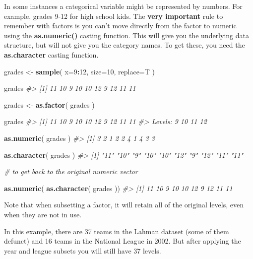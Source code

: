 \documentclass[]{book}
\newenvironment{Shaded}{\begin{snugshade}}{\end{snugshade}}
\newcommand{\CommentTok}[1]{\textcolor[rgb]{0.56,0.35,0.01}{\textit{#1}}}
\newcommand{\DataTypeTok}[1]{\textcolor[rgb]{0.13,0.29,0.53}{#1}}
\newcommand{\DecValTok}[1]{\textcolor[rgb]{0.00,0.00,0.81}{#1}}
\newcommand{\KeywordTok}[1]{\textcolor[rgb]{0.13,0.29,0.53}{\textbf{#1}}}
\newcommand{\NormalTok}[1]{#1}
\newcommand{\OperatorTok}[1]{\textcolor[rgb]{0.81,0.36,0.00}{\textbf{#1}}}
\newcommand{\StringTok}[1]{\textcolor[rgb]{0.31,0.60,0.02}{#1}}
\theoremstyle{definition}
\theoremstyle{definition}
\theoremstyle{definition}
\theoremstyle{remark}
\begin{document}
In some instances a categorical variable might be represented by
numbers. For example, grades 9-12 for high school kids. The \textbf{very
important} rule to remember with factors is you can't move directly from
the factor to numeric using the \textbf{as.numeric()} casting function.
This will give you the underlying data structure, but will not give you
the category names. To get these, you need the \textbf{as.character}
casting function.

\begin{Shaded}
\begin{Highlighting}[]

\NormalTok{grades <-}\StringTok{ }\KeywordTok{sample}\NormalTok{( }\DataTypeTok{x=}\DecValTok{9}\OperatorTok{:}\DecValTok{12}\NormalTok{, }\DataTypeTok{size=}\DecValTok{10}\NormalTok{, }\DataTypeTok{replace=}\NormalTok{T )}

\NormalTok{grades}
\CommentTok{#>  [1] 11 10  9 10 10 12  9 12 11 11}

\NormalTok{grades <-}\StringTok{ }\KeywordTok{as.factor}\NormalTok{( grades )}

\NormalTok{grades}
\CommentTok{#>  [1] 11 10 9  10 10 12 9  12 11 11}
\CommentTok{#> Levels: 9 10 11 12}

\KeywordTok{as.numeric}\NormalTok{( grades )}
\CommentTok{#>  [1] 3 2 1 2 2 4 1 4 3 3}

\KeywordTok{as.character}\NormalTok{( grades )}
\CommentTok{#>  [1] "11" "10" "9"  "10" "10" "12" "9"  "12" "11" "11"}

\CommentTok{# to get back to the original numeric vector}

\KeywordTok{as.numeric}\NormalTok{( }\KeywordTok{as.character}\NormalTok{( grades ))}
\CommentTok{#>  [1] 11 10  9 10 10 12  9 12 11 11}
\end{Highlighting}
\end{Shaded}

Note that when subsetting a factor, it will retain all of the original
levels, even when they are not in use.

In this example, there are 37 teams in the Lahman dataset (some of them
defunct) and 16 teams in the National League in 2002. But after applying
the year and league subsets you will still have 37 levels.
\end{document}
